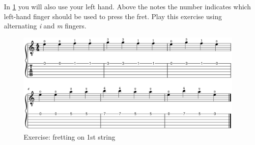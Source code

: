 In \ref{fig:exercise_fretting_fingering_first_string} you will also use your left hand. Above the notes the number indicates which left-hand finger should be used to press the fret. Play this exercise using alternating \textit{i} and \textit{m} fingers. 

\begin{figure}[h]
    \centering
    \includegraphics[width=\textwidth]{image/FirstStringFingers.png}
    \caption{Exercise: fretting on 1st string}
    \label{fig:exercise_fretting_fingering_first_string}
\end{figure}